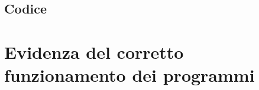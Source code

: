 \documentclass[a4paper]{article}
\begin{document}
\subsection{Codice}








\clearpage
\section{Evidenza del corretto funzionamento dei programmi}

\end{document}
